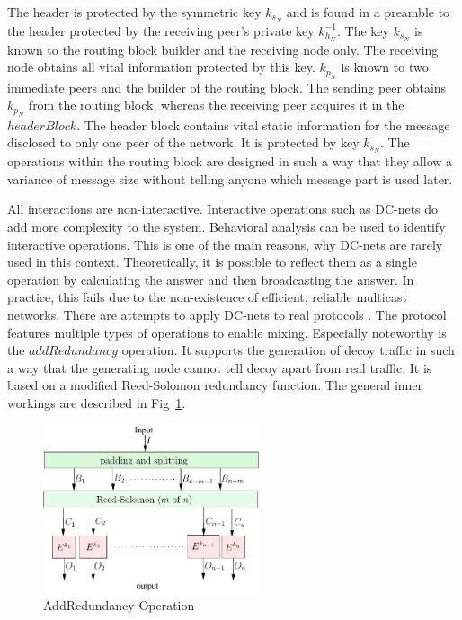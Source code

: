 \documentclass[runningheads]{llncs}
\begin{document}
The header is protected by the symmetric key $k_{s_N}$ and is found in a preamble to the header protected by the receiving peer's private key $k^{-1}_{h_N}$. The key $k_{s_N}$ is known to the routing block builder and the receiving node only. The receiving node obtains all vital information protected by this key. $k_{p_N}$ is known to two immediate peers and the builder of the routing block. The sending peer obtains $k_{p_N}$ from the routing block, whereas the receiving peer acquires it in the $headerBlock$. The header block contains vital static information for the message disclosed to only one peer of the network. It is protected by key $k_{s_N}$. The operations within the routing block are designed in such a way that they allow a variance of message size without telling anyone which message part is used later. 

All interactions are non-interactive. Interactive operations such as DC-nets do add more complexity to the system. Behavioral analysis can be used to identify interactive operations. This is one of the main reasons, why DC-nets are rarely used in this context. Theoretically, it is possible to reflect them as a single operation by calculating the answer and then broadcasting the answer. In practice, this fails due to the non-existence of efficient, reliable multicast networks. There are attempts to apply DC-nets to real protocols \cite{Corrigan-Gibbs:2010:DAA:1866307.1866346}. The protocol features multiple types of operations to enable mixing. Especially noteworthy is the $addRedundancy$ operation. It supports the generation of decoy traffic in such a way that the generating node cannot tell decoy apart from real traffic. It is based on a modified Reed-Solomon redundancy function. The general inner workings are described in Fig~\ref{fig:addRedundancy}.

\begin{figure}[htb]
	\centering
	\includegraphics[width=2.5in]{../../inc/addRedundancyOp}
	\caption{AddRedundancy Operation}
	\label{fig:addRedundancy}
\end{figure}
\end{document}
